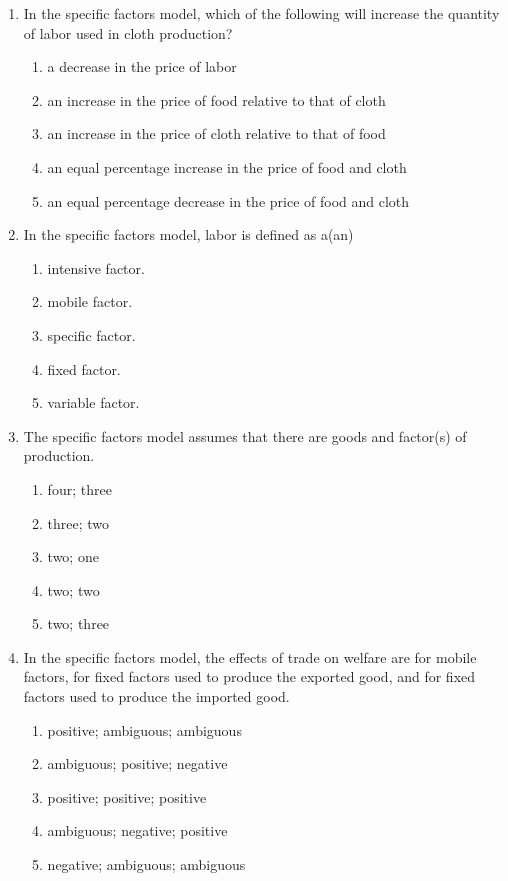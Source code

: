 \documentclass[12pt]{article}
\begin{document}
\begin{enumerate}[label=\textbf{\arabic*.}]
\item In the specific factors model, which of the following will increase the quantity of labor used in cloth production?
\begin{enumerate}[label=\Alph*.]
\item a decrease in the price of labor
\item an increase in the price of food relative to that of cloth
\item an increase in the price of cloth relative to that of food
\item an equal percentage increase in the price of food and cloth
\item an equal percentage decrease in the price of food and cloth
\end{enumerate}

\item In the specific factors model, labor is defined as a(an)
\begin{enumerate}[label=\Alph*.]
\item intensive factor.
\item mobile factor.
\item specific factor.
\item fixed factor.
\item variable factor.
\end{enumerate}

\item The specific factors model assumes that there are \underline{\hspace{2em}} goods and \underline{\hspace{2em}} factor(s) of production.
\begin{enumerate}[label=\Alph*.]
\item four; three
\item three; two
\item two; one
\item two; two
\item two; three
\end{enumerate}

\item In the specific factors model, the effects of trade on welfare are \underline{\hspace{2em}} for mobile factors, \underline{\hspace{2em}} for fixed factors used to produce the exported good, and \underline{\hspace{2em}} for fixed factors used to produce the imported good.
\begin{enumerate}[label=\Alph*.]
\item positive; ambiguous; ambiguous
\item ambiguous; positive; negative
\item positive; positive; positive
\item ambiguous; negative; positive
\item negative; ambiguous; ambiguous
\end{enumerate}


\end{enumerate}
\end{document}
